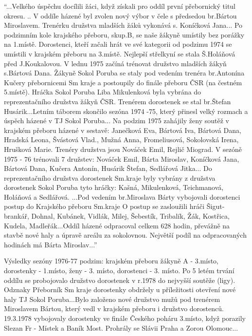 \documentclass[openany]{report}
\begin{document}
\enquote{...Velkého úspěchu docílili žáci, když získali pro oddíl první přebornický titul okresu. .. V oddíle házené byl zvolen nový výbor v čele s předsedou br.Bártou Miroslavem. Trenérku družstva mladších žáků vykonává s. Koníčková Jana...
Po podzimním kole krajského přeboru, skup.B, se naše žákyně umístily bez porážky na 1.místě. Dorostenci, kteří začali hrát ve své kategorii od podzimu 1974 se umístili v krajském přeboru na 3.místě. Nejlepší střelkyní se stala Š.Holáňová před J.Koukalovou. V lednu 1975 začíná trénovat družstvo mladších žákyň s.Bártová Dana. Žákyně Sokol Poruba se staly pod vedením trenéra br.Antonína Kučery přebornicemi Sm kraje a postoupily do finále přeboru ČSR (na čestném 5.místě). Hráčka Sokol Poruba Liba Mikulenková byla vybrána do reprezentačního družstva žákyň ČSR. Trenérem dorostenek se stal br.Štefan Husárik...Letním táborem skončilo sezóna 1974 -75, který přinesl velký rozmach a úspěch házené v TJ Sokol Poruba... Na podzim 1975 zahájily ženy soutěž v krajském přeboru házené v sestavě: Janečková Eva, Bártová Iva, Bártová Dana, Hradská Leona, Švástová Vlad., Mužná Anna, Fromeliusová, Sokolovská Irena, Hrušková Marie. Trenéry družstva jsou Nováček Emil, Rejlič Miograd.
V sezóně 1975 - 76 trénovali 7 družstev: Nováček Emil, Bárta Miroslav, Koníčková Jana, Bártová Dana, Kučera Antonín, Husárik Štefan, Sedlářová Jitka... Do reprezentačního družstva dorostenek Sm.kraje byly vybrány z družstva dorostenek Sokol Poruba tyto hráčky: Kašná, Mikulenková, Teichmanová, Holáňová a Sedlářová. ...Pod vedením br.Miroslava Bárty vybojovali dorostenci postup do Krajského přeboru Sm.kraje O postup se zasloužili hráči Šigut-brankář, Dohnal, Kubánek, Vidlák, Milej, Šebestík, Tribalík, Žák, Kostřica, Kudela, Madleřák...Oddíl házené odpracoval celkem 628 hodin, převážně na stavbě nové haly a úpravě areálu za sokolovnou. Největší podíl na odpracovaných hodinách má Bárta Miroslav...}

Výsledky sezóny 1976-77 podzim: krajském přeboru žákyně A - 3.místo, dorostenky - 1.místo, ženy - 3. místo, dorostenci - 3. místo.
Po 5 letém trvání oddílu se probojovalo družstvo dorostenek v r.1978 do nejvyšší soutěže (ligy). Odznaky Přeborník Sm kraje dorostenky obdržely u příležitosti otevření nové haly TJ Sokol Poruba...Bylo založeno nové družstvo mužů pod trenérem Miroslavem Bártou, který vedl v krajském přeboru i družstvo dorostenců. 19.3.1978 vybojovaly dorostenky ve finále Českého poháru 3.místo, když porazily Slezan Fr - Místek a Baník Most. Prohrály se Slávii Praha a Zorou Olomouc...
\end{document}
